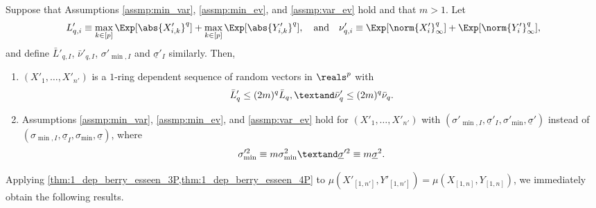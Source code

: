 \documentclass[aos]{imsart}
\begin{document}
\begin{lemma} \label{thm:1_to_m}
    Suppose that Assumptions \eqref{assmp:min_var}, \eqref{assmp:min_ev}, and \eqref{assmp:var_ev} hold and that $m > 1$. Let 
        \begin{equation*}
            L'_{q,i} \equiv \max_{k \in [p]} \Exp[\abs{X'_{i,k}}^q] + \max_{k \in [p]} \Exp[\abs{Y'_{i,k}}^q],\quad\mbox{and}\quad
            \nu'_{q,i} \equiv \Exp[\norm{X'_{i}}_\infty^q] + \Exp[\norm{Y'_{i}}_\infty^q],
        \end{equation*}
        and define $\bar{L}'_{q,I}$, $\bar{\nu}'_{q,I}$, $\sigma'_{\min,I}$ and $\underline{\sigma}'_I$ similarly. Then,
    \begin{enumerate}
        \item $(X'_1, \dots, X'_{n'})$ is a $1$-ring dependent sequence of random vectors in $\reals^p$ with
        \begin{equation*}
            \bar{L}'_q \leq (2m)^q \bar{L}_q,
            \textand
            \bar{\nu}'_q \leq (2m)^q \bar{\nu}_q.
        \end{equation*}
        
        \item Assumptions \eqref{assmp:min_var}, \eqref{assmp:min_ev}, and \eqref{assmp:var_ev} hold for $(X'_1, \dots, X'_{n'})$ with $(\sigma'_{\min,I}, \underline{\sigma}'_I, \sigma'_{\min}, \underline{\sigma}')$ instead of $(\sigma_{\min,I}, \underline{\sigma}_I, \sigma_{\min}, \underline{\sigma})$, where
        \begin{equation*}
            \sigma'^2_{\min} \equiv m \sigma^2_{\min}
            \textand
            \underline{\sigma}'^2 \equiv m \underline{\sigma}^2.
        \end{equation*}
    \end{enumerate} 
    
\end{lemma}


Applying \cref{thm:1_dep_berry_esseen_3P,thm:1_dep_berry_esseen_4P} to $\mu(X'_{[1,n']}, Y'_{[1,n']}) = \mu(X_{[1,n]}, Y_{[1,n]})$, we immediately obtain the following results. %
\end{document}
